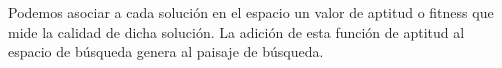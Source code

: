 Podemos asociar a cada solución en el espacio un valor de aptitud o fitness que mide la calidad de dicha solución. La adición de esta función de aptitud al espacio de búsqueda genera al paisaje de búsqueda.
\begin{figure}[H]
\centering
{}

\end{figure}
